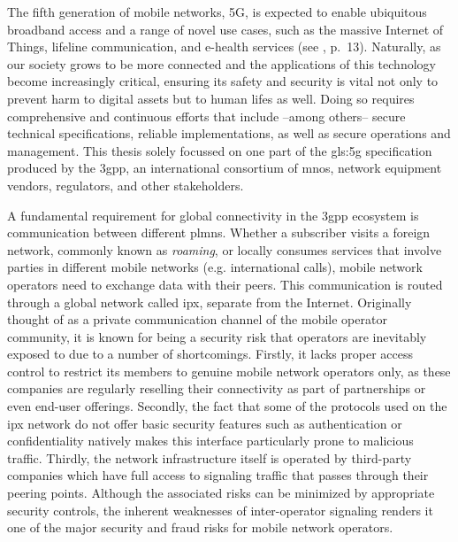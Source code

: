 The fifth generation of mobile networks, 5G, is expected to enable ubiquitous broadband access and a range of novel use cases, such as the massive Internet of Things, lifeline communication, and e-health services (see \cite{ngmn5Gwhite}, p.~13).
Naturally, as our society grows to be more connected and the applications of this technology become increasingly critical, ensuring its safety and security is vital not only to prevent harm to digital assets but to human lifes as well.
Doing so requires comprehensive and continuous efforts that include --among others-- secure technical specifications, reliable implementations, as well as secure operations and management.
This thesis solely focussed on one part of the \gls{gls:5g} specification produced by the \gls{3gpp}, an international consortium of \glspl{mno}, network equipment vendors, regulators, and other stakeholders.

A fundamental requirement for global connectivity in the \gls{3gpp} ecosystem is communication between different \glspl{plmn}.
Whether a subscriber visits a foreign network, commonly known as \textit{roaming}, or locally consumes services that involve parties in different mobile networks (e.g. international calls), mobile network operators need to exchange data with their peers.
This communication is routed through a global network called \gls{ipx}, separate from the Internet.
Originally thought of as a private communication channel of the mobile operator community, it is known for being a security risk that operators are inevitably exposed to due to a number of shortcomings.
Firstly, it lacks proper access control to restrict its members to genuine mobile network operators only, as these companies are regularly reselling their connectivity as part of partnerships or even end-user offerings.
Secondly, the fact that some of the protocols used on the \gls{ipx} network do not offer basic security features such as authentication or confidentiality natively makes this interface particularly prone to malicious traffic.
Thirdly, the network infrastructure itself is operated by third-party companies which have full access to signaling traffic that passes through their peering points.
Although the associated risks can be minimized by appropriate security controls, the inherent weaknesses of inter-operator signaling renders it one of the major security and fraud risks for mobile network operators.

